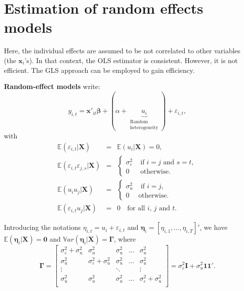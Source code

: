 \documentclass[
  12pt,
]{book}
\theoremstyle{definition}
\theoremstyle{definition}
\theoremstyle{definition}
\theoremstyle{definition}
\theoremstyle{remark}
\begin{document}
\hypertarget{RandomEffect}{%
\section{Estimation of random effects models}\label{RandomEffect}}

Here, the individual effects are assumed to be not correlated to other variables (the \(\mathbf{x}_i\)'s). In that context, the OLS estimator is consistent. However, it is not efficient. The GLS approach can be employed to gain efficiency.

\textbf{Random-effect models} write:
\[
y_{i,t}=\mathbf{x}'_{it}\boldsymbol\beta + (\alpha + \underbrace{u_i}_{\substack{\text{Random}\\\text{heterogeneity}}}) + \varepsilon_{i,t},
\]
with
\begin{eqnarray*}
\mathbb{E}(\varepsilon_{i,t}|\mathbf{X})&=&\mathbb{E}(u_{i}|\mathbf{X}) =0,\\
\mathbb{E}(\varepsilon_{i,t}\varepsilon_{j,s}|\mathbf{X}) &=&
\left\{
\begin{array}{cl}
\sigma_\varepsilon^2 & \mbox{ if $i=j$ and $s=t$},\\
0 & \mbox{ otherwise.}
\end{array}
\right.\\
\mathbb{E}(u_{i}u_{j}|\mathbf{X}) &=&
\left\{
\begin{array}{cl}
\sigma_u^2 & \mbox{ if $i=j$},\\
0 & \mbox{otherwise.}
\end{array}
\right.\\
\mathbb{E}(\varepsilon_{i,t}u_{j}|\mathbf{X})&=&0 \quad \text{for all $i$, $j$ and $t$}.
\end{eqnarray*}

Introducing the notations \(\eta_{i,t} = u_i + \varepsilon_{i,t}\) and \(\boldsymbol\eta_i = [\eta_{i,1},\dots,\eta_{i,T}]'\), we have \(\mathbb{E}(\boldsymbol\eta_i |\mathbf{X}) = \mathbf{0}\) and \(\mathbb{V}ar(\boldsymbol\eta_i | \mathbf{X}) = \boldsymbol\Gamma\), where
\[
\boldsymbol\Gamma = \left[  \begin{array}{ccccc}
\sigma_\varepsilon^2+\sigma_u^2 & \sigma_u^2 & \sigma_u^2 & \dots & \sigma_u^2\\
\sigma_u^2 & \sigma_\varepsilon^2+\sigma_u^2 & \sigma_u^2 & \dots & \sigma_u^2\\
\vdots && \ddots && \vdots \\
\sigma_u^2 & \sigma_u^2 & \sigma_u^2 & \dots & \sigma_\varepsilon^2+\sigma_u^2\\
\end{array}
\right] = \sigma_\varepsilon^2\mathbf{I} + \sigma_u^2\mathbf{1}\mathbf{1}'.
\]
\end{document}
